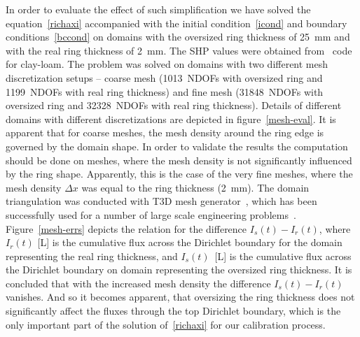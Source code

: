 \documentclass[review,times,3p,10pt]{elsarticle}
\begin{document}
{{ In order to evaluate the effect of such simplification we have solved the equation~\eqref{richaxi} accompanied with the initial condition~\eqref{icond} and boundary conditions~\eqref{bccond} on domains with the oversized ring thickness of 25~mm and with the real ring thickness of 2~mm. The SHP values were obtained from~\citep{retc} code for clay-loam. The problem was solved on domains with two different mesh discretization setups -- coarse mesh (1013~NDOFs with oversized ring and 1199~NDOFs with real ring thickness) and fine mesh (31848~NDOFs with oversized ring and 32328~NDOFs with real ring thickness).  Details of different domains with different discretizations are depicted in figure~\ref{mesh-eval}. It is apparent that for coarse meshes, the mesh density around the ring edge is governed by the domain shape. In order to validate the results the computation should be done on meshes, where the mesh density is not significantly influenced by the ring shape. Apparently, this is the case of the very fine meshes, where the mesh density $\Delta x$ was equal to the ring thickness (2~mm). The domain triangulation was conducted with T3D mesh generator~\citep{t3d}, which has been successfully used for a number of large scale engineering problems~\citep{rypl2010, kruis2002}. Figure~\ref{mesh-errs} depicts the relation for the difference $I_s(t)-I_r(t)$, where $I_r(t)$ [L] is the cumulative flux across the Dirichlet boundary for the domain representing the real ring thickness, and $I_s(t)$~[L] is the cumulative flux across the Dirichlet boundary on domain representing the oversized ring thickness. It is concluded that with the increased mesh density the difference $I_s(t)-I_r(t)$ vanishes.  And so it becomes apparent, that oversizing the ring thickness does not significantly affect the fluxes through the top Dirichlet boundary, which is the only important part of the solution of~\eqref{richaxi} for our calibration process. 

}}
\end{document}
